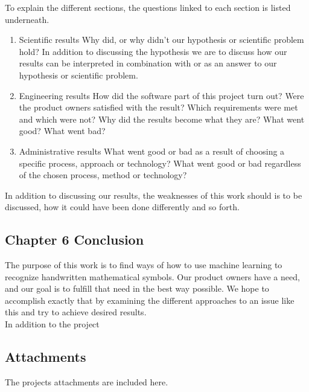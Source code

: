 
To explain the different sections, the questions linked to each section is listed underneath.
\begin{enumerate}


    \item Scientific results
    Why did, or why didn't our hypothesis or scientific problem hold?
    In addition to discussing the hypothesis we are to discuss how our results can be interpreted in combination with or as an answer to our hypothesis or scientific problem.
    
    \item Engineering results
    How did the software part of this project turn out? Were the product owners satisfied with the result? Which requirements were met and which were not? Why did the results become what they are? What went good? What went bad?
    
    \item Administrative results
    What went good or bad as a result of choosing a specific process, approach or technology? What went good or bad regardless of the chosen process, method or technology?
    
\end{enumerate}

% 
In addition to discussing our results, the weaknesses of this work should is to be discussed, how it could have been done differently and so forth. 

\subsection{Chapter 6 Conclusion}
The purpose of this work is to find ways of how to use machine learning to recognize handwritten mathematical symbols. Our product owners have a need, and our goal is to fulfill that need in the best way possible. We hope to accomplish exactly that by examining the different approaches to an issue like this and try to achieve desired results.\\
In addition to the project 

\subsection{Attachments}
The projects attachments are included here.


